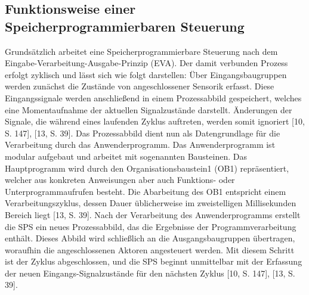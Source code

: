 \subsection{Funktionsweise einer Speicherprogrammierbaren Steuerung}
Grundsätzlich arbeitet eine Speicherprogrammierbare Steuerung nach dem Eingabe-Verarbeitung-Ausgabe-Prinzip (EVA). Der damit verbunden Prozess erfolgt zyklisch und lässt sich wie 
folgt darstellen:
Über Eingangsbaugruppen werden zunächst die Zustände von angeschlossener Sensorik erfasst. 
Diese Eingangssignale werden anschließend in einem Prozessabbild gespeichert, welches eine 
Momentaufnahme der aktuellen Signalzustände darstellt. Änderungen der Signale, die während 
eines laufenden Zyklus auftreten, werden somit ignoriert [10, S. 147], [13, S. 39]. 
Das Prozessabbild dient nun als Datengrundlage für die Verarbeitung durch das Anwenderprogramm. Das Anwenderprogramm ist modular aufgebaut und arbeitet mit sogenannten Bausteinen. Das Hauptprogramm wird durch den Organisationsbaustein1 (OB1) repräsentiert, welcher 
aus konkreten Anweisungen aber auch Funktions- oder Unterprogrammaufrufen besteht. Die 
Abarbeitung des OB1 entspricht einem Verarbeitungszyklus, dessen Dauer üblicherweise im
zweistelligen Millisekunden Bereich liegt [13, S. 39].
Nach der Verarbeitung des Anwenderprogramms erstellt die SPS ein neues Prozessabbild, das 
die Ergebnisse der Programmverarbeitung enthält. Dieses Abbild wird schließlich an die Ausgangsbaugruppen übertragen, woraufhin die angeschlossenen Aktoren angesteuert werden. Mit 
diesem Schritt ist der Zyklus abgeschlossen, und die SPS beginnt unmittelbar mit der Erfassung 
der neuen Eingangs-Signalzustände für den nächsten Zyklus [10, S. 147], [13, S. 39].
